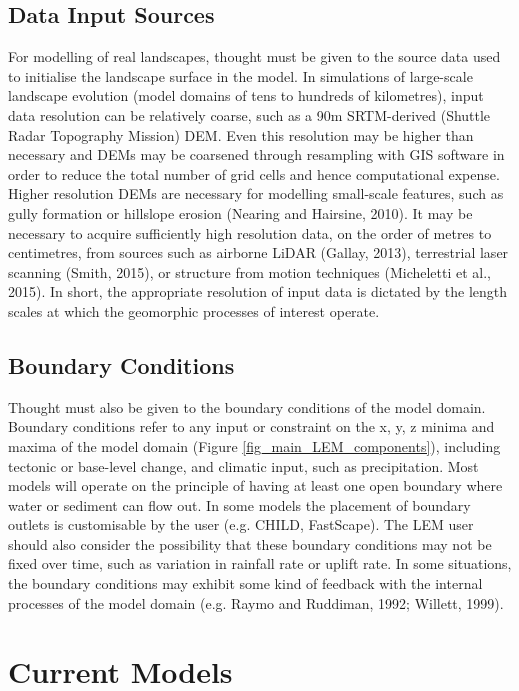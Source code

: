 \subsection{Data Input Sources}

For modelling of real landscapes, thought must be given to the source data used to initialise the landscape surface in the model. In simulations of large-scale landscape evolution (model domains of tens to hundreds of kilometres), input data resolution can be relatively coarse, such as a 90m SRTM-derived (Shuttle Radar Topography Mission) DEM. Even this resolution may be higher than necessary and DEMs may be coarsened through resampling with GIS software in order to reduce the total number of grid cells and hence computational expense. Higher resolution DEMs are necessary for modelling small-scale features, such as gully formation or hillslope erosion (Nearing and Hairsine, 2010). It may be necessary to acquire sufficiently high resolution data, on the order of metres to centimetres, from sources such as airborne LiDAR (Gallay, 2013), terrestrial laser scanning (Smith, 2015), or structure from motion techniques (Micheletti et al., 2015). In short, the appropriate resolution of input data is dictated by the length scales at which the geomorphic processes of interest operate.

\subsection{Boundary Conditions}
Thought must also be given to the boundary conditions of the model domain. Boundary conditions refer to any input or constraint on the x, y, z minima and maxima of the model domain (Figure \ref{fig_main_LEM_components}), including tectonic or base-level change, and climatic input, such as precipitation. Most models will operate on the principle of having at least one open boundary where water or sediment can flow out. In some models the placement of boundary outlets is customisable by the user (e.g. CHILD, FastScape). The LEM user should also consider the possibility that these boundary conditions may not be fixed over time, such as variation in rainfall rate or uplift rate. In some situations, the boundary conditions may exhibit some kind of feedback with the internal processes of the model domain (e.g. Raymo and Ruddiman, 1992; Willett, 1999).

\section{Current Models}

